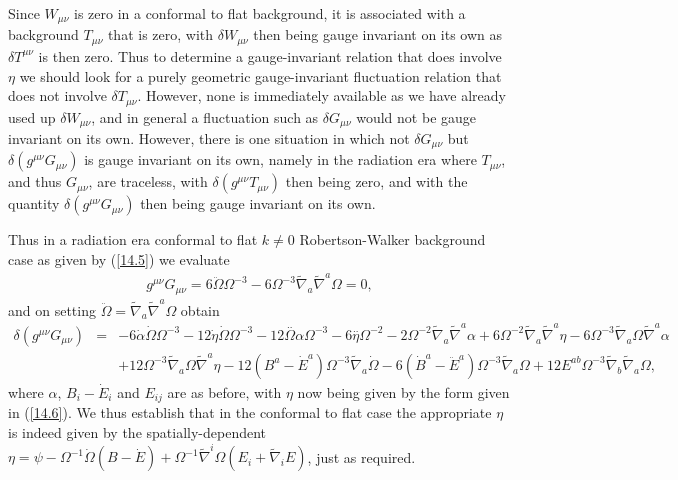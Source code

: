 \documentclass[aps,onecolumn,10pt]{revtex4}
\numberwithin{equation}{section}
\numberwithin{equation}{section}
\begin{document}
Since $W_{\mu\nu}$ is zero in a conformal to flat background, it is associated with a background $T_{\mu\nu}$ that is zero, with $\delta W_{\mu\nu}$ then being gauge invariant on its own as $\delta T^{\mu\nu}$ is then zero. Thus to determine a gauge-invariant relation that does involve $\eta$ we should look for a purely geometric gauge-invariant fluctuation relation that does not involve $\delta T_{\mu\nu}$. However, none is immediately available as we have already used up $\delta W_{\mu\nu}$, and in general a fluctuation such as $\delta G_{\mu\nu}$ would not be gauge invariant on its own. However, there is one situation in which not $\delta G_{\mu\nu}$ but  $\delta(g^{\mu\nu}G_{\mu\nu})$ is gauge invariant on its own, namely in the radiation era where $T_{\mu\nu}$, and thus $G_{\mu\nu}$, are traceless, with $\delta (g^{\mu\nu}T_{\mu\nu})$ then being zero, and with the quantity $\delta(g^{\mu\nu}G_{\mu\nu})$ then being gauge invariant on its own.

Thus in a radiation era conformal to flat $k\neq 0$ Robertson-Walker background case as given by (\ref{14.5}) we evaluate 
%
\begin{eqnarray}
g^{\mu\nu}G_{\mu\nu}=6\ddot{\Omega}\Omega^{-3}-6\Omega^{-3}\tilde{\nabla}_a\tilde{\nabla}^a\Omega=0,
\label{14.10}
\end{eqnarray}
%
and on setting $\ddot{\Omega}=\tilde{\nabla}_a\tilde{\nabla}^a\Omega$ obtain 
%
\begin{eqnarray}
\delta(g^{\mu\nu} G_{\mu\nu})&=& -6 \dot{\alpha} \dot{\Omega} \Omega^{-3} - 12 \dot{\eta} \dot{\Omega} \Omega^{-3} - 12 \overset{..}{\Omega} \alpha \Omega^{-3} - 6 \overset{..}{\eta} \Omega^{-2} - 2 \Omega^{-2} \tilde{\nabla}_{a}\tilde{\nabla}^{a}\alpha + 6 \Omega^{-2} \tilde{\nabla}_{a}\tilde{\nabla}^{a}\eta  - 6 \Omega^{-3} \tilde{\nabla}_{a}\Omega \tilde{\nabla}^{a}\alpha
\nonumber \\ 
&& + 12 \Omega^{-3} \tilde{\nabla}_{a}\Omega \tilde{\nabla}^{a}\eta -12 (B^{a}-\dot{E}^a) \Omega^{-3} \tilde{\nabla}_{a}\dot{\Omega} - 6 (\dot{B}^{a}-\ddot{E}^a) \Omega^{-3} \tilde{\nabla}_{a}\Omega +12 E^{ab} \Omega^{-3} \tilde{\nabla}_{b}\tilde{\nabla}_{a}\Omega,
\label{14.11}
\end{eqnarray}
%
where $\alpha$, $B_i-\dot{E}_i$ and $E_{ij}$ are as before, with $\eta$ now being given by the form given in (\ref{14.6}). We thus establish that in the conformal to flat case the appropriate $\eta$ is indeed given by the spatially-dependent $\eta=\psi -\Omega^{-1}\dot{\Omega}(B-\dot E)+\Omega^{-1}\tilde\nabla^i\Omega(E_i+\tilde\nabla_i E)$, just as required.
\end{document}

